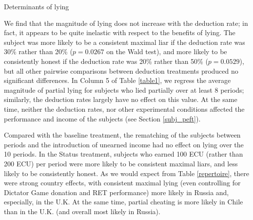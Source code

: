 \documentclass[12pt]{article}
\begin{document}
\begin{table}[ht]
\begin{center}
\tiny

\end{center}
\caption{Determinants of lying}
\label{table1}
\end{table}

\par We find that the magnitude of lying does not increase with the deduction rate; in fact, it appears to be quite inelastic with respect to the benefits of lying. The subject was more likely to be a consistent maximal liar if the deduction rate was 30\% rather than 20\% ($p=0.0267$ on the Wald test), and more likely to be consistently honest if the deduction rate was 20\% rather than 50\% ($p=0.0529$), but all other pairwise comparisons between 
deduction treatments produced no significant differences.\footnotemark{}
In Column 5 of Table \ref{table1}, we regress the average magnitude of partial lying for subjects who lied partially over at least 8 periods; similarly, the deduction rates largely have no effect on this value. At the same time, neither the deduction rates, nor other experimental conditions affected the performance and income of the subjects (see Section \ref{subj_peft}).  

\par Compared with the baseline treatment, the rematching of the subjects between periods and the introduction of unearned income had no effect on lying over the 10 periods. In the Status treatment, subjects who earned 100 ECU (rather than 200 ECU) per period were more likely to be consistent maximal liars, and less likely to be consistently honest.   
As we would expect from Table \ref{repertoire}, there were strong country effects, with consistent maximal lying (even controlling for Dictator Game donation and RET performance) more likely in Russia and, especially, in the U.K. At the same time, partial cheating is more likely in Chile than in the U.K. (and overall most likely in Russia). 



 
\end{document}
